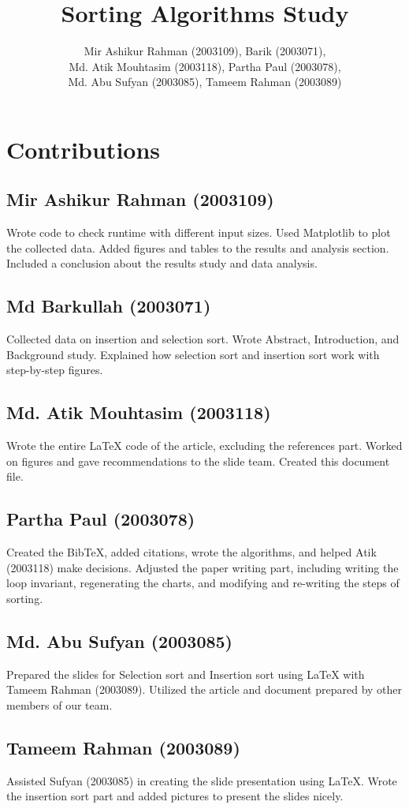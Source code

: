 \documentclass{article}
\title{Sorting Algorithms Study}
\author{Mir Ashikur Rahman (2003109), Barik (2003071), \\
        Md. Atik Mouhtasim (2003118), Partha Paul (2003078), \\
        Md. Abu Sufyan (2003085), Tameem Rahman (2003089)}
\begin{document}
\maketitle

\section*{Contributions}

\subsection*{Mir Ashikur Rahman (2003109)}
Wrote code to check runtime with different input sizes. Used Matplotlib to plot the collected data. Added figures and tables to the results and analysis section. Included a conclusion about the results study and data analysis.

\subsection*{Md Barkullah (2003071)}
Collected data on insertion and selection sort. Wrote Abstract, Introduction, and Background study. Explained how selection sort and insertion sort work with step-by-step figures.

\subsection*{Md. Atik Mouhtasim (2003118)}
Wrote the entire LaTeX code of the article, excluding the references part. Worked on figures and gave recommendations to the slide team. Created this document file.

\subsection*{Partha Paul (2003078)}
Created the BibTeX, added citations, wrote the algorithms, and helped Atik (2003118) make decisions. Adjusted the paper writing part, including writing the loop invariant, regenerating the charts, and modifying and re-writing the steps of sorting.

\subsection*{Md. Abu Sufyan (2003085)}
Prepared the slides for Selection sort and Insertion sort using LaTeX with Tameem Rahman (2003089). Utilized the article and document prepared by other members of our team.

\subsection*{Tameem Rahman (2003089)}
Assisted Sufyan (2003085) in creating the slide presentation using LaTeX. Wrote the insertion sort part and added pictures to present the slides nicely.
\end{document}

